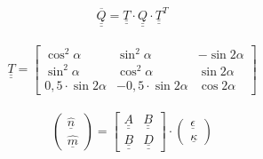 


\begin{equation}
	\overline{\underline{\underline{Q}}}=\underline{\underline{T}}\cdot \underline{\underline{Q}} \cdot \underline{\underline{T}}^{T}  
\end{equation}\\


\begin{equation}
	\underline{\underline{T}}=
	\begin{bmatrix}
		\cos^{2}\alpha&\sin^{2}\alpha&-\sin 2\alpha\\
		\sin^{2}\alpha&\cos^{2}\alpha&\sin 2\alpha\\
		0,5\cdot \sin2\alpha&-0,5\cdot\sin2\alpha&\cos 2\alpha
	\end{bmatrix}
\end{equation}\\


\begin{equation}
	\begin{pmatrix}
	\hat{\underline{n}}\\
	\hat{\underline{m}}
	\end{pmatrix}
= \begin{bmatrix}
	\underline{\underline{A}}&\underline{\underline{B}}\\
	\underline{\underline{B}}&\underline{\underline{D}}
\end{bmatrix}
\cdot \begin{pmatrix}
	\underline{\epsilon}\\
	\underline{\kappa}
\end{pmatrix}
\end{equation}\\

